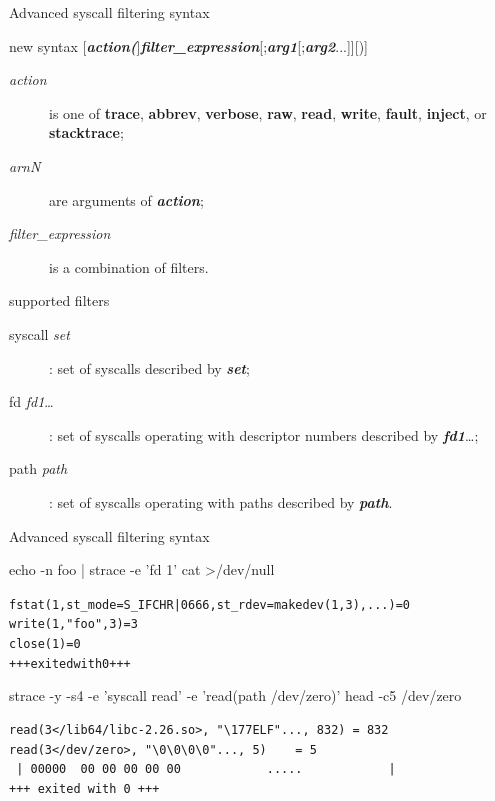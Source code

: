 \documentclass[unicode,aspectratio=169]{beamer}
\begin{document}
\begin{frame}[fragile]{Advanced syscall filtering syntax}
\begin{block}{new syntax}
[\textbf{\textit{action(}}]\textbf{\textit{filter\_expression}}[;\textbf{\textit{arg1}}[;\textbf{\textit{arg2}}...]][)]
\begin{description}
\item[\textit{action}] is one of \textbf{trace}, \textbf{abbrev}, \textbf{verbose},
\textbf{raw}, \textbf{read}, \textbf{write}, \textbf{fault},
\textbf{inject}, or \textbf{stacktrace};
\item[\textit{arnN}] are arguments of \textbf{\textit{action}};
\item[\textit{filter\_expression}] is a combination of filters.
\end{description}
\end{block}
\begin{block}{supported filters}
\begin{description}
\item[syscall \textit{set}]: set of syscalls described by \textbf{\textit{set}};
\item[fd \textit{fd1}\dots]: set of syscalls operating with descriptor numbers
described by \textbf{\textit{fd1}}\dots;
\item[path \textit{path}]: set of syscalls operating with paths
described by \textbf{\textit{path}}.
\end{description}
\end{block}
\end{frame}

\begin{frame}[fragile]{Advanced syscall filtering syntax}
\begin{block}{echo -n foo | strace -e 'fd 1' cat >/dev/null}
\begin{small}
\begin{alltt}
fstat(1, {st_mode=S_IFCHR|0666, st_rdev=makedev(1, 3), ...}) = 0
write(1, "foo", 3)                      = 3
close(1)                                = 0
+++ exited with 0 +++
\end{alltt}
\end{small}
\end{block}
\begin{block}{strace -y -s4 -e 'syscall read' -e 'read(path /dev/zero)'  head -c5 /dev/zero}
\begin{small}
\begin{verbatim}
read(3</lib64/libc-2.26.so>, "\177ELF"..., 832) = 832
read(3</dev/zero>, "\0\0\0\0"..., 5)    = 5
 | 00000  00 00 00 00 00            .....            |
+++ exited with 0 +++
\end{verbatim}
\end{small}
\end{block}
\end{frame}
\end{document}
